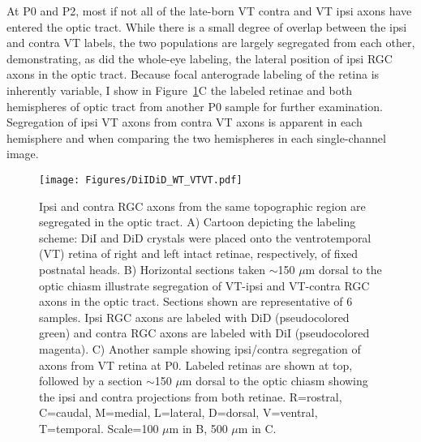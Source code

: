 At P0 and P2, most if not all of the late-born VT contra and VT ipsi axons have entered the optic tract.
While there is a small degree of overlap between the ipsi and contra VT labels, the two populations are largely segregated from each other, demonstrating, as did the whole-eye labeling, the lateral position of ipsi RGC axons in the optic tract.
Because focal anterograde labeling of the retina is inherently variable, I show in Figure~\ref{Figures/DiIDiDWTVTVT}C the labeled retinae and both hemispheres of optic tract from another P0 sample for further examination.
Segregation of ipsi VT axons from contra VT axons is apparent in each hemisphere and when comparing the two hemispheres in each single-channel image.
\begin{figure}[hbtp]
    \begin{center}
        \texttt{[image: Figures/DiIDiD\_WT\_VTVT.pdf]}
        \caption[Ipsi and contra RGC axons from the same topographic region are segregated in the optic tract.]
        {Ipsi and contra RGC axons from the same topographic region are segregated in the optic tract.
        A) Cartoon depicting the labeling scheme: DiI and DiD crystals were placed onto the ventrotemporal (VT) retina of right and left intact retinae, respectively, of fixed postnatal heads.
        B) Horizontal sections taken $\sim$150 $\mu$m dorsal to the optic chiasm illustrate segregation of VT-ipsi and VT-contra RGC axons in the optic tract.
        Sections shown are representative of 6 samples. %
		Ipsi RGC axons are labeled with DiD (pseudocolored green) and contra RGC axons are labeled with DiI (pseudocolored magenta).
        C) Another sample showing ipsi/contra segregation of axons from VT retina at P0.
        Labeled retinas are shown at top, followed by a section $\sim$150 $\mu$m dorsal to the optic chiasm showing the ipsi and contra projections from both retinae.
        R=rostral, C=caudal, M=medial, L=lateral, D=dorsal, V=ventral, T=temporal.
        Scale=100 $\mu$m in B, 500 $\mu$m in C.}
        \label{Figures/DiIDiDWTVTVT}
    \end{center}
\end{figure}